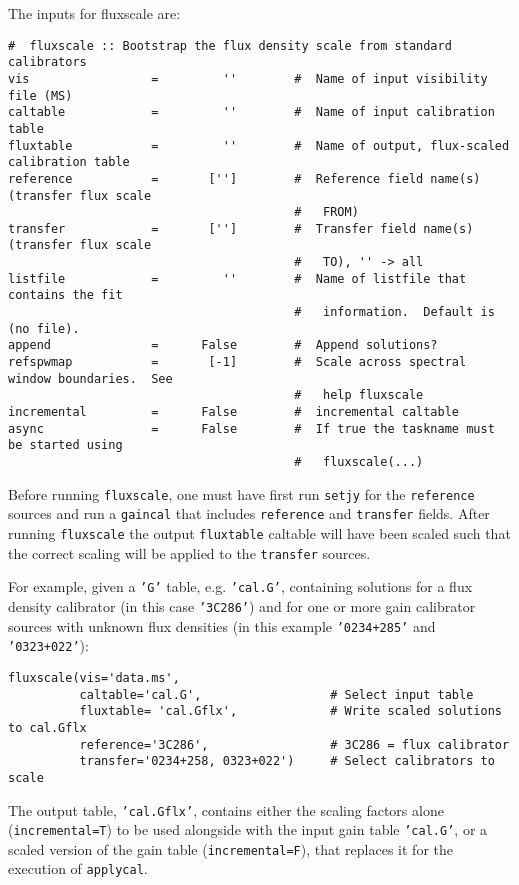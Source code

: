 The inputs for fluxscale are:
\small
\begin{verbatim}
#  fluxscale :: Bootstrap the flux density scale from standard calibrators
vis                 =         ''        #  Name of input visibility file (MS)
caltable            =         ''        #  Name of input calibration table
fluxtable           =         ''        #  Name of output, flux-scaled calibration table
reference           =       ['']        #  Reference field name(s) (transfer flux scale
                                        #   FROM)
transfer            =       ['']        #  Transfer field name(s) (transfer flux scale
                                        #   TO), '' -> all
listfile            =         ''        #  Name of listfile that contains the fit
                                        #   information.  Default is  (no file).
append              =      False        #  Append solutions?
refspwmap           =       [-1]        #  Scale across spectral window boundaries.  See
                                        #   help fluxscale
incremental         =      False        #  incremental caltable
async               =      False        #  If true the taskname must be started using
                                        #   fluxscale(...)
\end{verbatim}
\normalsize

Before running {\tt fluxscale}, one must have first run {\tt setjy} for the
{\tt reference} sources and run a {\tt gaincal} that includes {\tt reference}
and {\tt transfer} fields.  After running {\tt fluxscale} the output
{\tt fluxtable} caltable will have been scaled such that the correct
scaling will be applied to the {\tt transfer} sources.

For example, given a {\tt 'G'} table, e.g. {\tt 'cal.G'},
containing solutions for a flux density calibrator (in this case 
{\tt '3C286'}) and for one or more gain calibrator sources with
unknown flux densities (in this example {\tt '0234+285'} and 
{\tt '0323+022'}):
\small
\begin{verbatim}
fluxscale(vis='data.ms',
          caltable='cal.G',                  # Select input table
          fluxtable= 'cal.Gflx',             # Write scaled solutions to cal.Gflx
          reference='3C286',                 # 3C286 = flux calibrator
          transfer='0234+258, 0323+022')     # Select calibrators to scale
\end{verbatim}
\normalsize


The output table, {\tt 'cal.Gflx'}, contains either the scaling
factors alone ({\tt incremental=T}) to be used alongside with the
input gain table {\tt 'cal.G'}, or a scaled version of the gain table
({\tt incremental=F}), that replaces it for the execution of {\tt applycal}.


